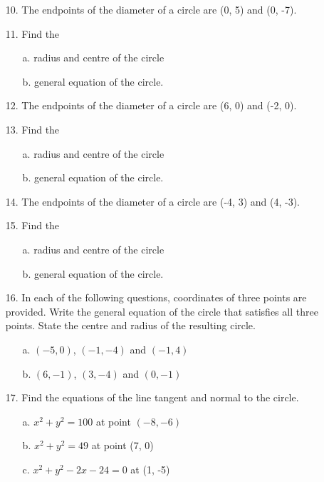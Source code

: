 \begin{enumerate}[leftmargin=*, widest=25]
\item[10.] The endpoints of the diameter of a circle are (0, 5) and (0, -7).
\item[11.] Find the
\begin{enumerate}
  \item[a.] radius and centre of the circle
  \item[b.] general equation of the circle.
\end{enumerate}

\item[12.] The endpoints of the diameter of a circle are (6, 0) and (-2, 0).
\item[13.] Find the
\begin{enumerate}
  \item[a.] radius and centre of the circle
  \item[b.] general equation of the circle.
\end{enumerate}

\item[14.] The endpoints of the diameter of a circle are (-4, 3) and (4, -3).
\item[15.] Find the
\begin{enumerate}
  \item[a.] radius and centre of the circle
  \item[b.] general equation of the circle.
\end{enumerate}

\item[16.] In each of the following questions, coordinates of three points are provided.
Write the general equation of the circle that satisfies all three points. State
the centre and radius of the resulting circle.
\begin{enumerate}
  \item[a.] $(-5, 0)$, $(-1, -4)$ and $(-1, 4)$
  \item[b.] $(6, -1)$, $(3, -4)$ and $(0, -1)$
\end{enumerate}

\item[17.] Find the equations of the line tangent and normal to the circle.
\begin{enumerate}
  \item[a.] $x^2 + y^2 = 100$ at point $(-8, -6)$
  \item[b.] $x^2 + y^2 = 49$ at point (7, 0)
  \item[c.] $x^2 + y^2 - 2x - 24 = 0$ at (1, -5)
\end{enumerate}


\end{enumerate}
